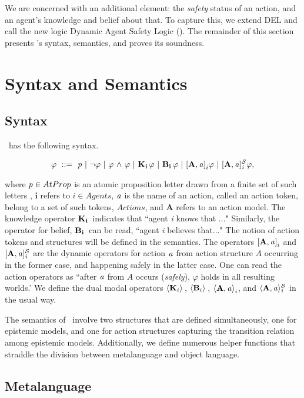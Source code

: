 We are concerned with an additional element: the \emph{safety} status of an action, and an agent's knowledge and belief about that. To capture this, we extend DEL and call the new logic Dynamic Agent Safety Logic (\DASL). The remainder of this section presents \DASL's syntax, semantics, and proves its soundness. 
\section{Syntax and Semantics}
\subsection{Syntax}
\DASL\  has the following syntax.

	$$ \varphi \ ::=\   \mathit{p}  \ |\  {\neg} \varphi \ |\  \varphi {\ \wedge \ } \varphi  \ |\  \mathbf{K}_{\mathbf{i}}\, \varphi \ |\  \mathbf{B}_{\mathbf{i}}\,\varphi \ |\  \mathbf{[A,\mathit{a}]}_i\varphi \ |\ \mathbf{[A,\mathit{a}]_{\mathit{i}}^\mathcal{S}}\varphi,$$

where $\mathit{p} \in AtProp$ is an atomic proposition letter drawn from a finite set of such letters , $\mathbf{i}$ refers to $i \in Agents$, $\mathbf{\mathit{a}}$ is the name of an action, called an action token, belong to a set of such tokens, $Actions$, and $\mathbf{A}$ refers to an action model. The knowledge operator $\mathbf{K}_{\mathbf{i}}\,$ indicates that ``agent \emph{i} knows that ..." Similarly, the operator for belief, $\mathbf{B}_{\mathbf{i}}\,$ can be read, ``agent \emph{i} believes that..." The notion of action tokens and structures will be defined in the semantics. The operators $\mathbf{[A,\mathit{a}]}_i$ and $\mathbf{[A,\mathit{a}]_{\mathit{i}}^\mathcal{S}}$ are the dynamic operators for action $\mathit{a}$ from action structure $A$ occurring in the former case, and happening safely in the latter case. One can read the action operators as ``after $\mathit{a}$ from $A$ occurs (\emph{safely}), $\varphi$ holds in all resulting worlds.' We define the dual modal operators $\langle \mathbf{K}_{i} \rangle\,$, $\langle \mathbf{B}_{i} \rangle\,$, $\mathbf{\langle A,\mathit{a}\rangle}_i$, and $\mathbf{\langle A,\mathit{a}\rangle_{\mathit{i}}^\mathcal{S}}$ in the usual way. 

The semantics of \DASL\ involve two structures that are defined simultaneously, one for epistemic models, and one for action structures capturing the transition relation among epistemic models. Additionally, we define numerous helper functions that straddle the division between metalanguage and object language. 

\subsection{Metalanguage}

